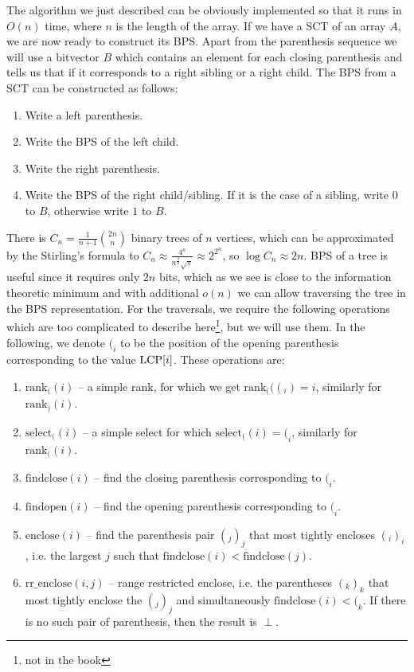 The algorithm we just described can be obviously implemented so that it runs in $O(n)$ time, where $n$ is the length of the array.
If we have a SCT of an array $A$, we are now ready to construct its BPS.
Apart from the parenthesis sequence we will use a bitvector $B$ which contains an element for each closing parenthesis and tells us that if it corresponds to a right sibling or a right child.
The BPS from a SCT can be constructed as follows:
\begin{enumerate}
    \item Write a left parenthesis.
    \item Write the BPS of the left child.
    \item Write the right parenthesis.
    \item Write the BPS of the right child/sibling. If it is the case of a sibling, write $0$ to $B$, otherwise write $1$ to $B$.
\end{enumerate}

There is $C_n = \frac{1}{n+1} \binom{2n}{n}$ binary trees of $n$ vertices, which can be approximated by the Stirling's formula to $C_n \approx \frac{4^n}{n^{\frac{3}{2}} \sqrt{\pi}} \approx 2^{2^n}$, so $\log C_n \approx 2n$.
BPS of a tree is useful since it requires only $2n$ bits, which as we see is close to the information theoretic minimum and with additional $o(n)$ we can allow traversing the tree in the BPS representation.
For the traversals, we require the following operations which are too complicated to describe here\footnote{not in the book}, but we will use them.
In the following, we denote $(_i$ to be the position of the opening parenthesis corresponding to the value $\text{LCP}[i]$.
These operations are:
\begin{enumerate}
    \item $\text{rank}_((i)$ -- a simple rank, for which we get $\text{rank}_(( (_i ) = i$, similarly for $\text{rank}_)(i)$.
    \item $\text{select}_((i)$ -- a simple select for which $\text{select}_((i) = (_i$, similarly for $\text{rank}_((i)$.
    \item $\text{findclose}(i)$ -- find the closing parenthesis corresponding to $(_i$.
    \item $\text{findopen}(i)$ -- find the opening parenthesis corresponding to $(_i$.
    \item $\text{enclose}(i)$ -- find the parenthesis pair $(_j )_j$ that most tightly encloses $(_i )_i$, i.e. the largest $j$ such that $\text{findclose}(i) < \text{findclose}(j)$.
    \item $\text{rr\_enclose}(i, j)$ -- range restricted enclose, i.e. the parentheses $(_k )_k$ that most tightly enclose the $(_j )_j$ and simultaneously $\text{findclose}(i) < (_k$. If there is no such pair of parenthesis, then the result is $\perp$. 
\end{enumerate}

